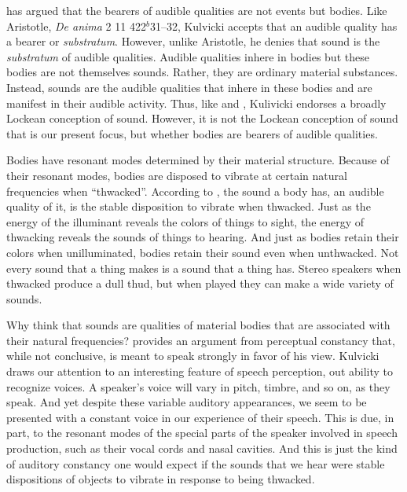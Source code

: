 \citet{Kulvicki:2008aa} has argued that the bearers of audible qualities are not events but bodies. Like Aristotle, \emph{De anima} 2 11 422\( ^{b} \)31–32, Kulvicki accepts that an audible quality has a bearer or \emph{substratum}. However, unlike Aristotle, he denies that sound is the \emph{substratum} of audible qualities. Audible qualities inhere in bodies but these bodies are not themselves sounds. Rather, they are ordinary material substances. Instead, sounds are the audible qualities that inhere in these bodies and are manifest in their audible activity. Thus, like \citet{Pasnau:1999ss} and \citet{Leddington:2014aa}, Kulivicki endorses a broadly Lockean conception of sound. However, it is not the Lockean conception of sound that is our present focus, but whether bodies are bearers of audible qualities.

Bodies have resonant modes determined by their material structure. Because of their resonant modes, bodies are disposed to vibrate at certain natural frequencies when ``thwacked''. According to \citet{Kulvicki:2008aa}, the sound a body has, an audible quality of it, is the stable disposition to vibrate when thwacked. Just as the energy of the illuminant reveals the colors of things to sight, the energy of thwacking reveals the sounds of things to hearing. And just as bodies retain their colors when unilluminated, bodies retain their sound even when unthwacked. Not every sound that a thing makes is a sound that a thing has. Stereo speakers when thwacked produce a dull thud, but when played they can make a wide variety of sounds.

Why think that sounds are qualities of material bodies that are associated with their natural frequencies? \citet[]{Kulvicki:2008aa} provides an argument from perceptual constancy that, while not conclusive, is meant to speak strongly in favor of his view. Kulvicki draws our attention to an interesting feature of speech perception, out ability to recognize voices. A speaker's voice will vary in pitch, timbre, and so on, as they speak. And yet despite these variable auditory appearances, we seem to be presented with a constant voice in our experience of their speech. This is due, in part, to the resonant modes of the special parts of the speaker involved in speech production, such as their vocal cords and nasal cavities. And this is just the kind of auditory constancy one would expect if the sounds that we hear were stable dispositions of objects to vibrate in response to being thwacked.

